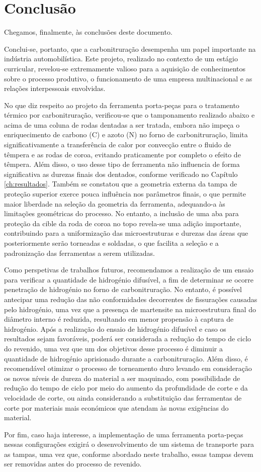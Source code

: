 \chapter{Conclusão} \label{ch:conclusao}
\setlength{\headheight}{13.6pt}
Chegamos, finalmente, às conclusões deste documento.
\par
Conclui-se, portanto, que a carbonitruração desempenha um papel importante na indústria automobilística. Este projeto, realizado no contexto de um estágio curricular, revelou-se extremamente valioso para a aquisição de conhecimentos sobre o processo produtivo, o funcionamento de uma empresa multinacional e as relações interpessoais envolvidas.
\par
No que diz respeito ao projeto da ferramenta porta-peças para o tratamento térmico por carbonitruração, verificou-se que o tamponamento realizado abaixo e acima de uma coluna de rodas dentadas a ser tratada, embora não impeça o enriquecimento de carbono (C) e azoto (N) no forno de carbonitruração, limita significativamente a transferência de calor por convecção entre o fluido de têmpera e as rodas de coroa, evitando praticamente por completo o efeito de têmpera. Além disso, o uso desse tipo de ferramenta não influencia de forma significativa as durezas finais dos dentados, conforme verificado no Capítulo \ref{ch:resultados}. Também se constatou que a geometria externa da tampa de proteção superior exerce pouca influência nos parâmetros finais, o que permite maior liberdade na seleção da geometria da ferramenta, adequando-a às limitações geométricas do processo. No entanto, a inclusão de uma aba para proteção da cible da roda de coroa no topo revela-se uma adição importante, contribuindo para a uniformização das microestruturas e durezas das áreas que posteriormente serão torneadas e soldadas, o que facilita a seleção e a padronização das ferramentas a serem utilizadas.
\par
Como perspetivas de trabalhos futuros, recomendamos a realização de um ensaio para verificar a quantidade de hidrogénio difusível, a fim de determinar se ocorre penetração de hidrogénio no forno de carbonitruração. No entanto, é possível antecipar uma redução das não conformidades decorrentes de fissurações causadas pelo hidrogénio, uma vez que a presença de martensite na microestrutura final do diâmetro interno é reduzida, resultando em menor propensão à captura de hidrogénio. Após a realização do ensaio de hidrogénio difusível e caso os resultados sejam favoráveis, poderá ser considerada a redução do tempo de ciclo do revenido, uma vez que um dos objetivos desse processo é diminuir a quantidade de hidrogénio aprisionado durante a carbonitruração. Além disso, é recomendável otimizar o processo de torneamento duro levando em consideração os novos níveis de dureza do material a ser maquinado, com possibilidade de redução do tempo de ciclo por meio do aumento da profundidade de corte e da velocidade de corte, ou ainda considerando a substituição das ferramentas de corte por materiais mais económicos que atendam às novas exigências do material.
\par
Por fim, caso haja interesse, a implementação de uma ferramenta porta-peças nessas configurações exigirá o desenvolvimento de um sistema de transporte para as tampas, uma vez que, conforme abordado neste trabalho, essas tampas devem ser removidas antes do processo de revenido.